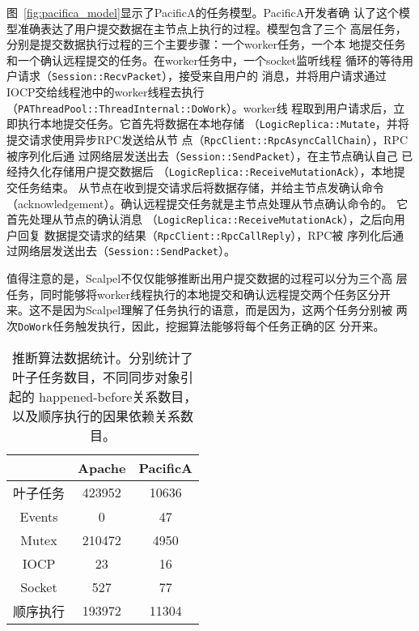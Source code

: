 
图~\ref{fig:pacifica_model}显示了PacificA的任务模型。PacificA开发者确
认了这个模型准确表达了用户提交数据在主节点上执行的过程。模型包含了三个
高层任务，分别是提交数据执行过程的三个主要步骤：一个worker任务，一个本
地提交任务和一个确认远程提交的任务。在worker任务中，一个socket监听线程
循环的等待用户请求（\texttt{Session\-::Recv\-Packet}），接受来自用户的
消息，并将用户请求通过IOCP交给线程池中的worker线程去执行
（\texttt{PA\-Thread\-Pool\-::Thread\-Internal\-::DoWork}）。worker线
程取到用户请求后，立即执行本地提交任务。它首先将数据在本地存储
（\texttt{Logic\-Replica\-::Mutate}，并将提交请求使用异步RPC发送给从节
点（\texttt{Rpc\-Client\-::Rpc\-Async\-Call\-Chain}），RPC被序列化后通
过网络层发送出去（\texttt{Session\-::Send\-Packet}），在主节点确认自己
已经持久化存储用户提交数据后
（\texttt{Logic\-Replica\-::Receive\-MutationAck}），本地提交任务结束。
从节点在收到提交请求后将数据存储，并给主节点发确认命令
（acknowledgement）。确认远程提交任务就是主节点处理从节点确认命令的。
它首先处理从节点的确认消息
（\texttt{Logic\-Replica\-::Receive\-Mutation\-Ack}），之后向用户回复
数据提交请求的结果（\texttt{Rpc\-Client\-::Rpc\-Call\-Reply}），RPC被
序列化后通过网络层发送出去（\texttt{Session\-::Send\-Packet}）。

值得注意的是，Scalpel不仅仅能够推断出用户提交数据的过程可以分为三个高
层任务，同时能够将worker线程执行的本地提交和确认远程提交两个任务区分开
来。这不是因为Scalpel理解了任务执行的语意，而是因为，这两个任务分别被
两次\texttt{DoWork}任务触发执行，因此，挖掘算法能够将每个任务正确的区
分开来。

\begin{table}[t!]
\small
\centering
\begin{minipage}{0.8\linewidth}
\centering
\caption{推断算法数据统计。分别统计了叶子任务数目，不同同步对象引起的
happened-before关系数目，以及顺序执行的因果依赖关系数目。}
\label{fig:statistics}
\begin{tabular}{ccc}

\toprule[1.5pt]
  		& Apache	& PacificA \\
\midrule[1pt]
叶子任务	& 423952	& 10636 \\
Events		& 0			& 47 \\
Mutex 		& 210472	& 4950 \\
IOCP		& 23		& 16 \\
Socket		& 527		& 77 \\
顺序执行	& 193972	& 11304 \\
\bottomrule[1.5pt]
\end{tabular}
\end{minipage}
\end{table}

